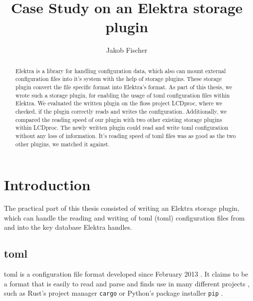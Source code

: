 \documentclass[draft,final]{vutinfth} %
\title{Case Study on an Elektra storage plugin }
\author{Jakob Fischer}
\begin{document}
\frontmatter

\addstatementpage




\begin{abstract}
Elektra is a library for handling configuration data, which also can mount external configuration files into it's system with the help of storage plugins.
These storage plugin convert the file specific format into Elektra's format.
As part of this thesis, we wrote such a storage plugin, for enabling the usage of \acrshort{toml} configuration files within Elektra.
We evaluated the written plugin on the \acrshort{floss} project LCDproc, where we checked, if the plugin correctly reads and writes the configuration.
Additionally, we compared the reading speed of our plugin with two other existing storage plugins within LCDproc.
The newly written plugin could read and write \acrshort{toml} configuration without any loss of information.
It's reading speed of \acrshort{toml} files was as good as the two other plugins, we matched it against.
\end{abstract}


\tableofcontents

\mainmatter

\chapter{Introduction}

The practical part of this thesis consisted of writing an Elektra storage plugin, which can handle the reading and writing of \acrshort{toml} (\acrlong{toml}) configuration files from and into the key database Elektra handles.

\section{\acrshort{toml}}
\acrlong{toml} is a configuration file format developed since February 2013 \cite{tomlcontrib}.
It claims to be a format that is easily to read and parse \cite{tomlreadme} and finds use in many different projects \cite{tomlwiki}, such as Rust's project manager \texttt{cargo} \cite{cargogit} or Python's package installer \texttt{pip} \cite{piprefguide}.
\end{document}
